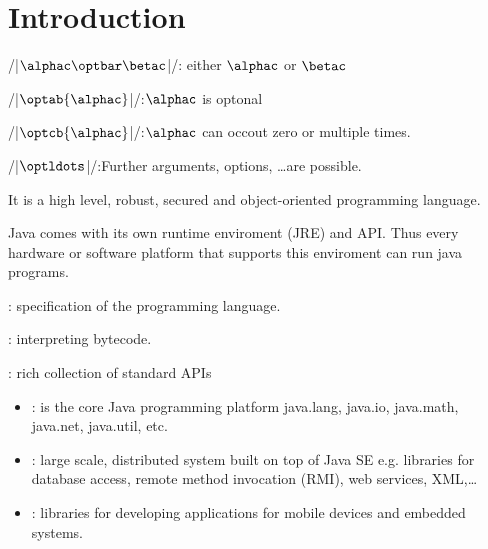 \section{Introduction}
\begin{sectionbox}\nospacing
  \begin{itemizenosep}
      \item \cppinline[bgcolor=mintinlinebox]/|$\alphac \optbar \betac$|/:\hfil
    either $\alphac$ or $\betac$
      \item \cppinline[bgcolor=mintinlinebox]/|$\optab{\alphac}$|/:\hfil$\alphac$ is optonal
      \item \cppinline[bgcolor=mintinlinebox]/|$\optcb{\alphac}$|/:\hfil$\alphac$ can
    occout zero or multiple times.
      \item \cppinline[bgcolor=mintinlinebox]/|$\optldots$|/:\hfil Further arguments,
    options, \ldots are possible.
  \end{itemizenosep}
\end{sectionbox}
\begin{sectionbox}\nospacing
  \begin{itemizenosep}
    \item It is a high level, robust, secured and object-oriented programming
  language.
    \item Java comes with its own runtime enviroment (JRE) and API.
  Thus every hardware or software platform that supports this enviroment
  can run java programs.
  \end{itemizenosep}
\end{sectionbox}
\begin{sectionbox}\nospacing
  \begin{itemizenosep}
      \item {}: specification of the programming language.
      \item {} : interpreting bytecode.
      \item {}: rich collection of standard APIs
    \begin{itemize}[nolistsep, noitemsep]
        \item {}: is the core Java programming platform
      java.lang, java.io, java.math, java.net, java.util, etc.
        \item {}: large scale, distributed system
      built on top of Java SE e.g. libraries for database access, remote method invocation (RMI), web services, XML,\ldots
        \item {}: libraries for developing applications for mobile devices and embedded systems.
    \end{itemize}
  \end{itemizenosep}
\end{sectionbox}
